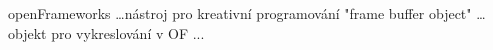 
\abbrv[OF]	openFrameworks \dots nástroj pro kreativní programování
\abbrv[FBO]  "frame buffer object" \dots objekt pro vykreslování v OF
\abbrv[...]     ...
\stopAbbreviations

\endinput
